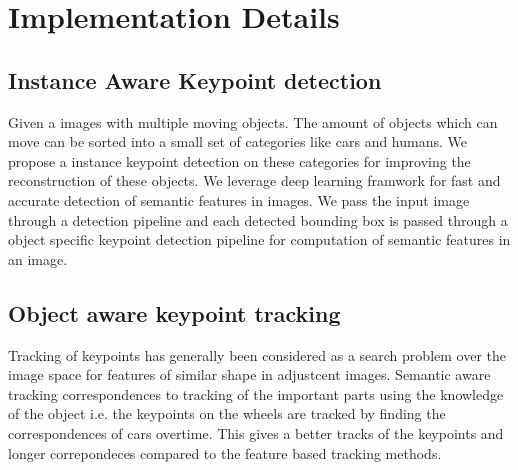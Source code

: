 \documentclass[10pt,twocolumn,letterpaper]{article}
\begin{document}
\section{Implementation Details}

\subsection{Instance Aware Keypoint detection}
Given a images with multiple moving objects. The amount of objects which can move can be sorted into a small set of categories like cars and humans. We propose a instance keypoint detection on these categories for improving the reconstruction of these objects. We leverage deep learning framwork for fast and accurate detection of semantic features in images. We pass the input image through a detection pipeline and each detected bounding box is passed through a object specific keypoint detection pipeline for computation of semantic features in an image.  

\subsection{Object aware keypoint tracking}
Tracking of keypoints has generally been considered as a search problem over the image space for features of similar shape in adjustcent images. Semantic aware tracking correspondences to tracking of the important parts using the knowledge of the object i.e. the keypoints on the wheels are tracked by finding the correspondences of cars overtime. This gives a better tracks of the keypoints and longer correpondeces compared to the feature based tracking methods. 
\end{document}

